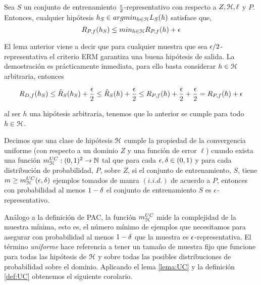     
    \begin{lema}\label{lema:UC}
    Sea $S$ un conjunto de entrenamiento $\frac{\epsilon}{2}$-representativo con respecto a $Z, \mathcal{H}, \ell$ y $P$. Entonces, cualquier hipótesis $h_S \in argmin_{h \in \mathcal{H}}L_S(h)$ satisface que,
    \begin{equation}
        R_{P,f}(h_S) \leq min_{h \in \mathcal{H}} R_{P,f}(h) + \epsilon
    \end{equation}
    \end{lema}
    
    El lema anterior viene a decir que para cualquier muestra que sea $\epsilon/2$-representativa el criterio ERM garantiza una buena hipótesis de salida. La demostración es prácticamente inmediata, para ello basta considerar $h\in \mathcal{H}$ arbitraria, entonces
    
    \begin{equation}
        R_{D,f}(h_S) \leq \hat{R}_S(h_S) + \frac{\epsilon}{2} \leq \hat{R}_S(h) + \frac{\epsilon}{2} \leq R_{P,f}(h) + \frac{\epsilon}{2} + \frac{\epsilon}{2} = R_{P,f}(h) + \epsilon
    \end{equation}
    
    \noindent al ser $h$ una hipótesis arbitraria, tenemos que lo anterior se cumple para todo $h \in \mathcal{H}$. 
    
    
    
    
    \begin{definicion}\label{def:UC}
       Decimos que una clase de hipótesis $\mathcal{H}$ cumple la propiedad de la convergencia uniforme (con respecto a un dominio $Z$ y una función de error $\ell$) cuando exista una función $m_{\mathcal{H}}^{UC}:(0,1)^2 \to \mathbb{N}$ tal que para cada $\epsilon, \delta \in (0,1)$ y para cada distribución de probabilidad, $P$, sobre $Z$, si el conjunto de entrenamiento, $S$, tiene $m\geq m_{\mathcal{H}}^{UC}(\epsilon,\delta)$ ejemplos tomados de manra $(i.i.d.)$ de acuerdo a $P$, entonces con probabilidad al menos $1-\delta$ el conjunto de entrenamiento $S$ es $\epsilon$-representativo.
    \end{definicion}
    
    Análogo a la definición de PAC, la función $m_{\mathcal{H}}^{UC}$ mide la complejidad de la muestra mínima, esto es, el número mínimo de ejemplos que necesitamos para asegurar con probabilidad al menos $1 - \delta$ que la muestra es $\epsilon$-representativa. El término \textit{uniforme} hace referencia a tener un tamaño de muestra fijo que funcione para todas las hipótesis de $\mathcal{H}$ y sobre todas las posibles distribuciones de probabilidad sobre el dominio. Aplicando el lema \ref{lema:UC} y la definición \ref{def:UC} obtenemos el siguiente corolario. \\
    
